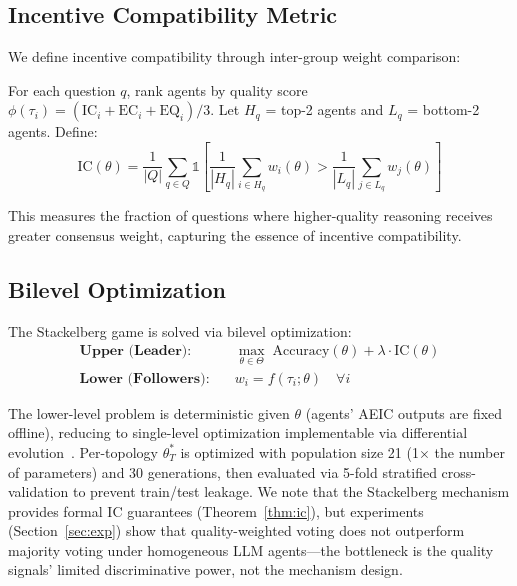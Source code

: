 \subsection{Incentive Compatibility Metric}
\label{sec:ic_metric}

We define incentive compatibility through inter-group weight comparison:

\begin{definition}
For each question $q$, rank agents by quality score $\phi(\tau_i) = (\text{IC}_i + \text{EC}_i + \text{EQ}_i)/3$. Let $H_q$ = top-2 agents and $L_q$ = bottom-2 agents. Define:
\begin{equation}
    \text{IC}(\theta) = \frac{1}{|Q|} \sum_{q \in Q} \mathbb{1}\!\left[\frac{1}{|H_q|}\sum_{i \in H_q} w_i(\theta) > \frac{1}{|L_q|}\sum_{j \in L_q} w_j(\theta)\right]
    \label{eq:ic_metric}
\end{equation}
\end{definition}

This measures the fraction of questions where higher-quality reasoning receives greater consensus weight, capturing the essence of incentive compatibility.

\subsection{Bilevel Optimization}
\label{sec:bilevel}

The Stackelberg game is solved via bilevel optimization:
\begin{align}
    \textbf{Upper (Leader):} \quad & \max_{\theta \in \Theta} \; \text{Accuracy}(\theta) + \lambda \cdot \text{IC}(\theta) \label{eq:upper} \\
    \textbf{Lower (Followers):} \quad & w_i = f(\tau_i; \theta) \quad \forall i \label{eq:lower}
\end{align}

The lower-level problem is deterministic given $\theta$ (agents' AEIC outputs are fixed offline), reducing to single-level optimization implementable via differential evolution~\cite{storn1997differential}. Per-topology $\theta^*_T$ is optimized with population size 21 (1$\times$ the number of parameters) and 30 generations, then evaluated via 5-fold stratified cross-validation to prevent train/test leakage. We note that the Stackelberg mechanism provides formal IC guarantees (Theorem~\ref{thm:ic}), but experiments (Section~\ref{sec:exp}) show that quality-weighted voting does not outperform majority voting under homogeneous LLM agents---the bottleneck is the quality signals' limited discriminative power, not the mechanism design.

